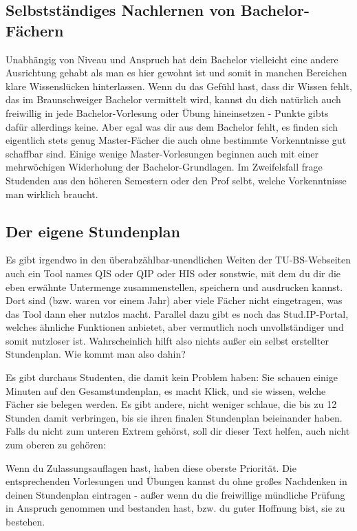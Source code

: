 \subsection{Selbstständiges Nachlernen von Bachelor-Fächern}
Unabhängig von Niveau und Anspruch hat dein Bachelor vielleicht eine andere Ausrichtung gehabt als man es hier gewohnt ist und somit in manchen Bereichen klare Wissenslücken hinterlassen. Wenn du das Gefühl hast, dass dir Wissen fehlt, das im Braunschweiger Bachelor vermittelt wird, kannst du dich natürlich auch freiwillig in jede Bachelor-Vorlesung oder Übung hineinsetzen - Punkte gibts dafür allerdings keine. Aber egal was dir aus dem Bachelor fehlt, es finden sich eigentlich stets genug Master-Fächer die auch ohne bestimmte Vorkenntnisse gut schaffbar sind. Einige wenige Master-Vorlesungen beginnen auch mit einer mehrwöchigen Widerholung der Bachelor-Grundlagen. Im Zweifelsfall frage Studenden aus den höheren Semestern oder den Prof selbt, welche Vorkenntnisse man wirklich braucht.

\subsection{Der eigene Stundenplan}
Es gibt irgendwo in den überabzählbar-unendlichen Weiten der TU-BS-Webseiten auch ein Tool names QIS oder QIP oder HIS oder sonstwie, mit dem du dir die eben erwähnte Untermenge zusammenstellen, speichern und ausdrucken kannst. Dort sind (bzw. waren vor einem Jahr) aber viele Fächer nicht eingetragen, was das Tool dann eher nutzlos macht. Parallel dazu gibt es noch das Stud.IP-Portal, welches ähnliche Funktionen anbietet, aber vermutlich noch unvollständiger und somit nutzloser ist. Wahrscheinlich hilft also nichts außer ein selbst erstellter Stundenplan. Wie kommt man also dahin?

Es gibt durchaus Studenten, die damit kein Problem haben: Sie schauen einige Minuten auf den Gesamstundenplan, es macht Klick, und sie wissen, welche Fächer sie belegen werden. Es gibt andere, nicht weniger schlaue, die bis zu 12 Stunden damit verbringen, bis sie ihren finalen Stundenplan beieinander haben. Falls du nicht zum unteren Extrem gehörst, soll dir dieser Text helfen, auch nicht zum oberen zu gehören:

Wenn du Zulassungsauflagen hast, haben diese oberste Priorität. Die entsprechenden Vorlesungen und Übungen kannst du ohne großes Nachdenken in deinen Stundenplan eintragen - außer wenn du die freiwillige mündliche Prüfung in Anspruch genommen und bestanden hast, bzw. du guter Hoffnung bist, sie zu bestehen.

